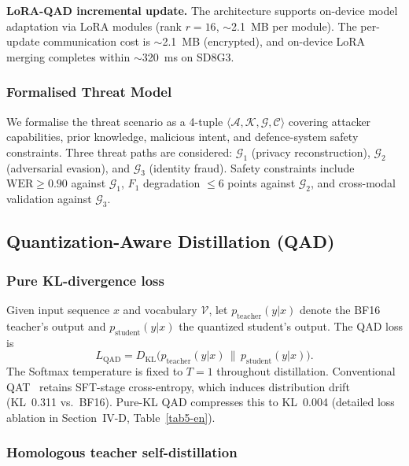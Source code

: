 \documentclass[lettersize,journal]{IEEEtran}
\begin{document}
\medskip
\noindent\textbf{LoRA-QAD incremental update.} The architecture supports on-device model adaptation via LoRA modules (rank $r=16$, $\sim$2.1~MB per module). The per-update communication cost is $\sim$2.1~MB (encrypted), and on-device LoRA merging completes within $\sim$320~ms on SD8G3.

\subsubsection{Formalised Threat Model}

We formalise the threat scenario as a 4-tuple $\langle \mathcal{A}, \mathcal{K}, \mathcal{G}, \mathcal{C} \rangle$ covering attacker capabilities, prior knowledge, malicious intent, and defence-system safety constraints. Three threat paths are considered: $\mathcal{G}_1$ (privacy reconstruction), $\mathcal{G}_2$ (adversarial evasion), and $\mathcal{G}_3$ (identity fraud). Safety constraints include $\text{WER}\ge 0.90$ against $\mathcal{G}_1$, $F_1$ degradation $\le 6$ points against $\mathcal{G}_2$, and cross-modal validation against $\mathcal{G}_3$.

\subsection{Quantization-Aware Distillation (QAD)}
\subsubsection{Pure KL-divergence loss}

Given input sequence $x$ and vocabulary $\mathcal{V}$, let $p_{\text{teacher}}(y|x)$ denote the BF16 teacher's output and $p_{\text{student}}(y|x)$ the quantized student's output. The QAD loss is
\begin{equation}
\label{eq:kl-loss}
L_{\mathrm{QAD}} = D_{\mathrm{KL}}\!\bigl( p_{\text{teacher}}(y|x)\,\|\,p_{\text{student}}(y|x) \bigr).
\end{equation}
The Softmax temperature is fixed to $T = 1$ throughout distillation. Conventional QAT~\cite{24,25,26} retains SFT-stage cross-entropy, which induces distribution drift (KL~0.311 vs.\ BF16). Pure-KL QAD compresses this to KL~0.004 (detailed loss ablation in Section~IV-D, Table~\ref{tab5-en}).

\subsubsection{Homologous teacher self-distillation}
\end{document}
